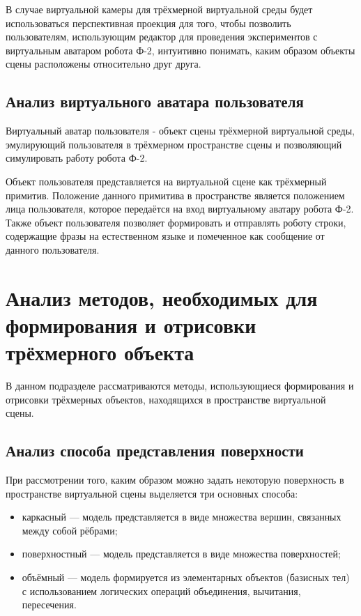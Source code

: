 В случае виртуальной камеры для трёхмерной виртуальной среды будет использоваться перспективная проекция для того, чтобы позволить пользователям, использующим редактор для проведения экспериментов с виртуальным аватаром робота Ф-2, интуитивно понимать, каким образом объекты сцены расположены относительно друг друга.

\subsection{Анализ виртуального аватара пользователя}
Виртуальный аватар пользователя - объект сцены трёхмерной виртуальной среды, эмулирующий пользователя в трёхмерном пространстве сцены и позволяющий симулировать работу робота Ф-2.

Объект пользователя представляется на виртуальной сцене как трёхмерный примитив. Положение данного примитива в пространстве является положением лица пользователя, которое передаётся на вход виртуальному аватару робота Ф-2. Также объект пользователя позволяет формировать и отправлять роботу строки, содержащие фразы на естественном языке и помеченное как сообщение от данного пользователя.

\section{Анализ методов, необходимых для формирования и отрисовки трёхмерного объекта}
В данном подразделе рассматриваются методы, использующиеся формирования и отрисовки трёхмерных объектов, находящихся в пространстве виртуальной сцены.

\subsection{Анализ способа представления поверхности}
При рассмотрении того, каким образом можно задать некоторую поверхность в пространстве виртуальной сцены выделяется три основных способа:
\begin{itemize}
	\item каркасный — модель представляется в виде множества вершин, связанных между собой рёбрами;
	\item поверхностный — модель представляется в виде множества поверхностей;
	\item объёмный — модель формируется из элементарных объектов (базисных тел) с использованием логических операций объединения, вычитания, пересечения.
\end{itemize}

